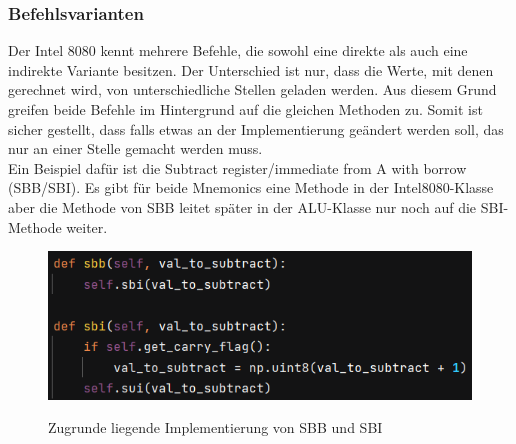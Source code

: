 \documentclass[12pt]{article}
\newcommand{\imgSpaceBefore}{\\[0.2cm]}
\begin{document}
\noindent


\subsubsection{Befehlsvarianten}

Der Intel 8080 kennt mehrere Befehle, die sowohl eine direkte als auch eine indirekte Variante besitzen. Der Unterschied ist nur, dass die Werte, mit denen gerechnet wird, von unterschiedliche Stellen geladen werden. Aus diesem Grund greifen beide Befehle im Hintergrund auf die gleichen Methoden zu. Somit ist sicher gestellt, dass falls etwas an der Implementierung geändert werden soll, das nur an einer Stelle gemacht werden muss.
\\
Ein Beispiel dafür ist die \glqq Subtract register/immediate from A with borrow (SBB/SBI)\grqq. Es gibt für beide Mnemonics eine Methode in der Intel8080-Klasse aber die Methode von SBB leitet später in der ALU-Klasse nur noch auf die SBI-Methode weiter.
\imgSpaceBefore
\begin{figure}[h]
\caption{Zugrunde liegende Implementierung von SBB und SBI}
\centering
\includegraphics[width=15cm]{Bilder/DoubleUsedMethodSubtract}
\label{fig:DoubleUsedMethodSubtract}
\end{figure}
\end{document}
